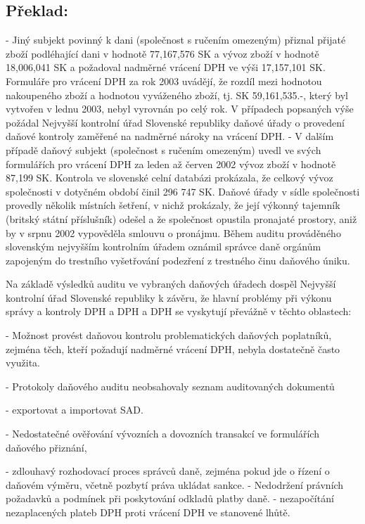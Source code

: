 \documentclass[10pt]{article}
\begin{document}
\pagebreak

\subsection*{Překlad:}

- Jiný subjekt povinný k dani (společnost s ručením omezeným) přiznal přijaté zboží podléhající dani v hodnotě 77,167,576 SK a vývoz zboží v hodnotě 18,006,041 SK a požadoval nadměrné vrácení DPH ve výši 17,157,101 SK.
Formuláře pro vrácení DPH za rok 2003 uvádějí, že rozdíl mezi hodnotou nakoupeného zboží a hodnotou vyváženého zboží, tj. SK 59,161,535.-, který byl vytvořen v lednu 2003, nebyl vyrovnán po celý rok.
V případech popsaných výše požádal Nejvyšší kontrolní úřad Slovenské republiky daňové úřady o provedení daňové kontroly zaměřené na nadměrné nároky na vrácení DPH.
- V dalším případě daňový subjekt (společnost s ručením omezeným) uvedl ve svých formulářích pro vrácení DPH za leden až červen 2002 vývoz zboží v hodnotě 87,199 SK.
Kontrola ve slovenské celní databázi prokázala, že celkový vývoz společnosti v dotyčném období činil 296 747 SK.
Daňové úřady v sídle společnosti provedly několik místních šetření, v nichž prokázaly, že její výkonný tajemník (britský státní příslušník) odešel a že společnost opustila pronajaté prostory, aniž by v srpnu 2002 vypověděla smlouvu o pronájmu.
Během auditu prováděného slovenským nejvyšším kontrolním úřadem oznámil správce daně orgánům zapojeným do trestního vyšetřování podezření z trestného činu daňového úniku.


Na základě výsledků auditu ve vybraných daňových úřadech dospěl Nejvyšší kontrolní úřad Slovenské republiky k závěru, že hlavní problémy při výkonu správy a kontroly DPH a DPH a DPH se vyskytují převážně v těchto oblastech:

- Možnost provést daňovou kontrolu problematických daňových poplatníků, zejména těch, kteří požadují nadměrné vrácení DPH, nebyla dostatečně často využita.


- Protokoly daňového auditu neobsahovaly seznam auditovaných dokumentů

- exportovat a importovat SAD.


- Nedostatečné ověřování vývozních a dovozních transakcí ve formulářích daňového přiznání,

- zdlouhavý rozhodovací proces správců daně, zejména pokud jde o řízení o daňovém výměru, včetně pozbytí práva ukládat sankce.
- Nedodržení právních požadavků a podmínek při poskytování odkladů platby daně.
- nezapočítání nezaplacených plateb DPH proti vrácení DPH ve stanovené lhůtě.
\end{document}
